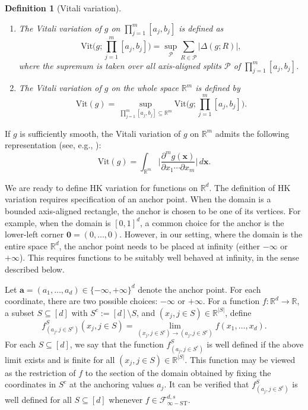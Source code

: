 \documentclass[10pt]{article}
\newtheorem{definition}{Definition}
\newcommand{\R}{{\mathbb R}}
\newcommand{\fstinf}{{\mathcal{F}^{d, s}_{\infty-\text{ST}}}}
\newcommand{\vit}{{\text{Vit}}}
\newcommand{\xbf}{{\mathbf{x}}}
\newcommand{\abf}{{\mathbf{a}}}
\newcommand{\zerovec}{{\mathbf{0}}}
\begin{document}
\begin{definition}[Vitali variation]
\begin{enumerate}[label = (\alph*)]
    \item The Vitali variation of $g$ on 
    $\prod_{j = 1}^{m} [a_j, b_j]$ is defined as
    \begin{equation*}
        \vit\Big(g; \prod_{j = 1}^{m} [a_j, b_j]\Big) 
        = \sup_{\mathcal{P}} \sum_{R \in \mathcal{P}} |\Delta(g; R)|,
    \end{equation*}
    where the supremum is taken over all axis-aligned splits 
    $\mathcal{P}$ of $\prod_{j = 1}^{m} [a_j, b_j]$.
    \item The Vitali variation of $g$ on the whole space $\R^m$ is 
    defined by
    \begin{equation*}
        \vit(g) = \sup_{\prod_{j = 1}^{m} [a_j, b_j] \subseteq \R^m}
        \vit\Big(g; \prod_{j = 1}^{m} [a_j, b_j]\Big).
    \end{equation*}  
\end{enumerate}
\end{definition}
If $g$ is sufficiently smooth, the Vitali variation of $g$ on 
$\R^{m}$ admits the following representation (see, e.g., 
\citet[Section 9]{owen2005multidimensional}):
\begin{equation}\label{vit-smooth-characterization}
    \vit(g) = \int_{\R^m} \Big| 
    \frac{\partial^m g(\xbf)}{\partial x_1 \cdots \partial x_m} 
    \Big| \, d\xbf.
\end{equation}

We are ready to define HK variation for functions on $\R^d$. The
definition of HK variation requires specification of an anchor 
point. When the domain is a bounded axis-aligned rectangle, the 
anchor is chosen to be one of its vertices. For example, when the 
domain is $[0, 1]^d$, a common choice for the anchor is the 
lower-left corner $\zerovec = (0, \dots, 0)$. However, in our 
setting, where the domain is the entire space $\R^d$, the anchor 
point needs to be placed at infinity (either $-\infty$ or $+\infty$). This requires 
functions to be suitably well behaved at infinity, in the sense 
described below.

Let $\abf = (a_1, \dots, a_d) \in \{-\infty, +\infty\}^d$ denote 
the anchor point. For each coordinate, there are two possible 
choices: $-\infty$ or $+\infty$. For a function $f: \R^d \to \R$, 
a subset $S \subseteq [d]$ with $S^c := [d] \setminus S$, and $(x_j, j
\in S) \in \R^{|S|}$, define  
\begin{equation}\label{eq:f_section}
    f^S_{(a_j, j \in S^c)}(x_j, j \in S) 
    = \lim_{(x_j, j \in S^c) \to (a_j, j \in S^c)} 
    f(x_1, \dots, x_d). 
\end{equation}
For each $S \subseteq [d]$, we say that the function
$f^S_{(a_j, j \in S^c)}$ is well defined if the above limit exists 
and is finite for all $(x_j, j \in S) \in \R^{|S|}$. This function 
may be viewed as the restriction of $f$ to the section of the 
domain obtained by fixing the coordinates in $S^c$ at the anchoring 
values $a_j$. It can be verified that $f^S_{(a_j, j \in S^c)}$ is 
well defined for all $S \subseteq [d]$ whenever $f \in \fstinf$. 
\end{document}
